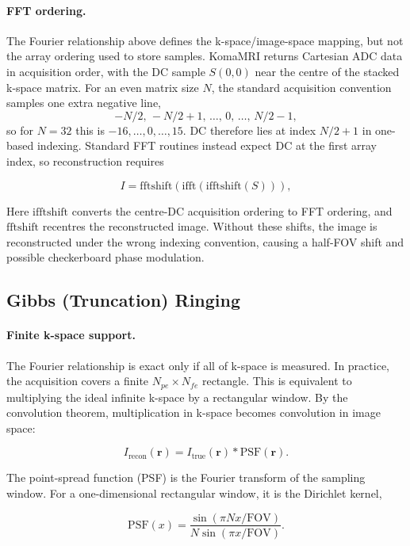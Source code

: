 \paragraph{FFT ordering.}
The Fourier relationship above defines the k-space/image-space mapping,
but not the array ordering used to store samples. KomaMRI returns
Cartesian ADC data in acquisition order, with the DC sample \(S(0,0)\)
near the centre of the stacked k-space matrix. For an even matrix size
\(N\), the standard acquisition convention samples one extra negative
line,
\[
    -N/2,\,-N/2+1,\,\dots,\,0,\,\dots,\,N/2-1,
\]
so for \(N=32\) this is \(-16,\dots,0,\dots,15\). DC therefore lies at
index \(N/2+1\) in one-based indexing. Standard FFT routines instead
expect DC at the first array index, so reconstruction requires

\[
    I = \mathrm{fftshift}\left(
        \mathrm{ifft}\left(\mathrm{ifftshift}(S)\right)
    \right),
\]

Here \(\mathrm{ifftshift}\) converts the centre-DC acquisition ordering
to FFT ordering, and \(\mathrm{fftshift}\) recentres the reconstructed
image. Without these shifts, the image is reconstructed under the wrong
indexing convention, causing a half-FOV shift and possible checkerboard
phase modulation.

\subsection{Gibbs (Truncation) Ringing}
\paragraph{Finite k-space support.}
The Fourier relationship is exact only if all of k-space is measured. In
practice, the acquisition covers a finite \(N_{pe}\times N_{fe}\)
rectangle. This is equivalent to multiplying the ideal infinite k-space
by a rectangular window. By the convolution theorem, multiplication in
k-space becomes convolution in image space:

\begin{equation}
    I_{\mathrm{recon}}(\mathbf{r})
    =
    I_{\mathrm{true}}(\mathbf{r}) * \mathrm{PSF}(\mathbf{r}).
\end{equation}

The point-spread function (PSF) is the Fourier transform of the sampling
window. For a one-dimensional rectangular window, it is the Dirichlet
kernel,

\begin{equation}
    \mathrm{PSF}(x) =
    \frac{\sin(\pi N x/\mathrm{FOV})}
         {N\sin(\pi x/\mathrm{FOV})}.
\end{equation}

